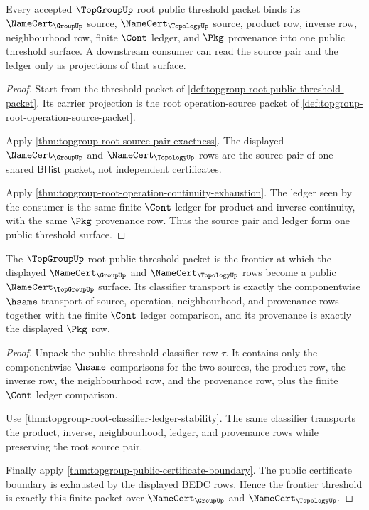 \begin{theorem}
\label{thm:topgroup-root-source-ledger-public-threshold}
Every accepted $\TopGroupUp$ root public threshold packet binds its
$\NameCert_{\GroupUp}$ source, $\NameCert_{\TopologyUp}$ source, product row,
inverse row, neighbourhood row, finite $\Cont$ ledger, and $\Pkg$ provenance
into one public threshold surface. A downstream consumer can read the source
pair and the ledger only as projections of that surface.
\end{theorem}
\begin{proof}
Start from the threshold packet of
\autoref{def:topgroup-root-public-threshold-packet}. Its carrier projection
is the root operation-source packet of
\autoref{def:topgroup-root-operation-source-packet}.

Apply \autoref{thm:topgroup-root-source-pair-exactness}. The displayed
$\NameCert_{\GroupUp}$ and $\NameCert_{\TopologyUp}$ rows are the source pair
of one shared $\mathsf{BHist}$ packet, not independent certificates.

Apply \autoref{thm:topgroup-root-operation-continuity-exhaustion}. The ledger
seen by the consumer is the same finite $\Cont$ ledger for product and inverse
continuity, with the same $\Pkg$ provenance row. Thus the source pair and
ledger form one public threshold surface.
\end{proof}

\begin{theorem}
\label{thm:topgroup-root-namecert-frontier-threshold}
The $\TopGroupUp$ root public threshold packet is the frontier at which the
displayed $\NameCert_{\GroupUp}$ and $\NameCert_{\TopologyUp}$ rows become a
public $\NameCert_{\TopGroupUp}$ surface. Its classifier transport is exactly
the componentwise $\hsame$ transport of source, operation, neighbourhood, and
provenance rows together with the finite $\Cont$ ledger comparison, and its
provenance is exactly the displayed $\Pkg$ row.
\end{theorem}
\begin{proof}
Unpack the public-threshold classifier row $\tau$. It contains only the
componentwise $\hsame$ comparisons for the two sources, the product row, the
inverse row, the neighbourhood row, and the provenance row, plus the finite
$\Cont$ ledger comparison.

Use \autoref{thm:topgroup-root-classifier-ledger-stability}. The same
classifier transports the product, inverse, neighbourhood, ledger, and
provenance rows while preserving the root source pair.

Finally apply \autoref{thm:topgroup-public-certificate-boundary}. The public
certificate boundary is exhausted by the displayed BEDC rows. Hence the
frontier threshold is exactly this finite packet over
$\NameCert_{\GroupUp}$ and $\NameCert_{\TopologyUp}$.
\end{proof}

